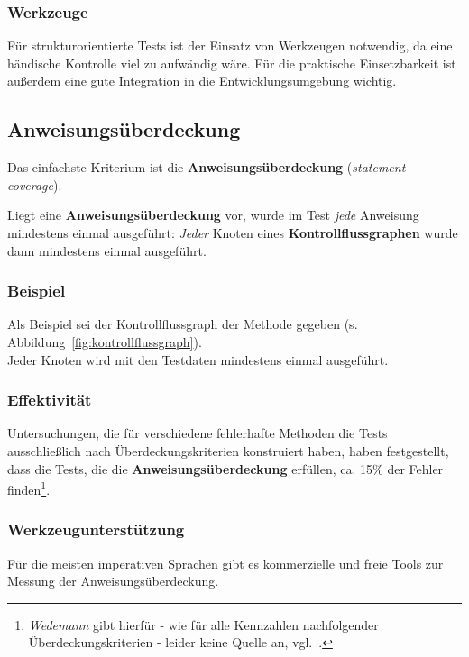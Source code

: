 \subsubsection*{Werkzeuge}
Für strukturorientierte Tests ist der Einsatz von Werkzeugen notwendig, da eine händische Kontrolle viel zu aufwändig wäre.
Für die praktische Einsetzbarkeit ist außerdem eine gute Integration in die Entwicklungsumgebung wichtig.

\subsection{Anweisungsüberdeckung}
Das einfachste Kriterium ist die \textbf{Anweisungsüberdeckung} (\textit{statement coverage}).

\begin{tcolorbox}[title=Anweisungsüberdeckung]
    Liegt eine \textbf{Anweisungsüberdeckung} vor, wurde im Test \textit{jede} Anweisung mindestens einmal ausgeführt: \textit{Jeder} Knoten eines \textbf{Kontrollflussgraphen} wurde dann mindestens einmal ausgeführt.
\end{tcolorbox}

\subsubsection*{Beispiel}
Als Beispiel sei der Kontrollflussgraph der Methode  gegeben (s. Abbildung~\ref{fig:kontrollflussgraph}).\\
Jeder Knoten wird mit den Testdaten  mindestens einmal ausgeführt.

\subsubsection*{Effektivität}
Untersuchungen, die für verschiedene fehlerhafte Methoden die Tests ausschließlich nach Überdeckungskriterien konstruiert haben, haben festgestellt, dass die Tests, die die \textbf{Anweisungsüberdeckung} erfüllen, ca. 15\% der Fehler finden\footnote{
\textit{Wedemann} gibt hierfür - wie für alle Kennzahlen nachfolgender Überdeckungskriterien - leider keine Quelle an, vgl.~\cite[51]{Wed09c}.
}.

\subsubsection*{Werkzeugunterstützung}
Für die meisten imperativen Sprachen gibt es kommerzielle und freie Tools zur Messung der Anweisungsüberdeckung.

